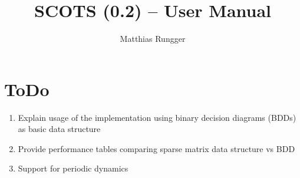 \documentclass[a4paper]{amsart}
\title{SCOTS (0.2) -- User Manual}
\author{Matthias Rungger}
\begin{document}
  \maketitle

	\tableofcontents
	\newpage
	

\section{ToDo}

\begin{enumerate}
  \item Explain usage of the implementation using binary decision diagrams
  (BDDs) as basic data structure
  \item Provide performance tables comparing sparse matrix data structure vs BDD
  \item Support for periodic dynamics
\end{enumerate}





%
%
%
%
%
%
\end{document}
